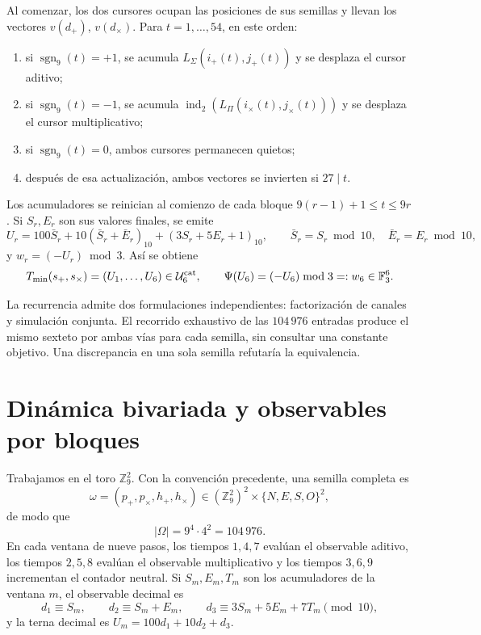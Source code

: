\begin{algorithm}
\label{pf84:E02-16}
Al comenzar, los dos cursores ocupan las posiciones de sus semillas y llevan
los vectores \(v(d_+)\), \(v(d_\times)\). Para
\(t=1,\ldots,54\), en este orden:
\begin{enumerate}
  \item si \(\operatorname{sgn}_9(t)=+1\), se acumula
  \(L_\Sigma(i_+(t),j_+(t))\) y se desplaza el cursor aditivo;
  \item si \(\operatorname{sgn}_9(t)=-1\), se acumula
  \(\operatorname{ind}_2(L_\Pi(i_\times(t),j_\times(t)))\) y se desplaza el
  cursor multiplicativo;
  \item si \(\operatorname{sgn}_9(t)=0\), ambos cursores permanecen quietos;
  \item después de esa actualización, ambos vectores se invierten si
  \(27\mid t\).
\end{enumerate}
Los acumuladores se reinician al comienzo de cada bloque
\(9(r-1)+1\leq t\leq9r\). Si \(S_r,E_r\) son sus valores finales, se emite
\[
 U_r=100\bar S_r+10(\bar S_r+\bar E_r)_{10}
       +(3S_r+5E_r+1)_{10},
 \qquad
 \bar S_r=S_r\bmod10,\quad \bar E_r=E_r\bmod10,
\]
y \(w_r=(-U_r)\bmod3\). Así se obtiene
\[
 T_{\min}(s_+,s_\times)=(U_1,\ldots,U_6)
 \in\mathcal U_6^{\rm cat},
 \qquad
 \Psi(U_6)=(-U_6)\bmod3=:w_6\in\mathbb F_3^6.
\]
\end{algorithm}

\begin{criterion}
\label{pf84:E02-17}
La recurrencia admite dos formulaciones independientes: factorización de
canales y simulación conjunta. El recorrido exhaustivo de las
\(104\,976\) entradas produce el mismo sexteto por ambas vías para cada
semilla, sin consultar una constante objetivo. Una discrepancia en una sola
semilla refutaría la equivalencia.
\end{criterion}

\section{Dinámica bivariada y observables por bloques}

Trabajamos en el toro \(\mathbb Z_9^2\). Con la convención precedente, una
semilla completa es
\[
\omega=(p_+,p_\times,h_+,h_\times)
\in(\mathbb Z_9^2)^2\times\{N,E,S,O\}^2,
\]
de modo que
\[
|\Omega|=9^4\cdot4^2=104\,976.
\]
En cada ventana de nueve pasos, los tiempos \(1,4,7\) evalúan el observable aditivo,
los tiempos \(2,5,8\) evalúan el observable multiplicativo y los tiempos \(3,6,9\)
incrementan el contador neutral. Si \(S_m,E_m,T_m\) son los acumuladores
de la ventana \(m\), el observable decimal es
\[
d_1\equiv S_m,\qquad
d_2\equiv S_m+E_m,\qquad
d_3\equiv3S_m+5E_m+7T_m\pmod{10},
\]
y la terna decimal es \(U_m=100d_1+10d_2+d_3\).

